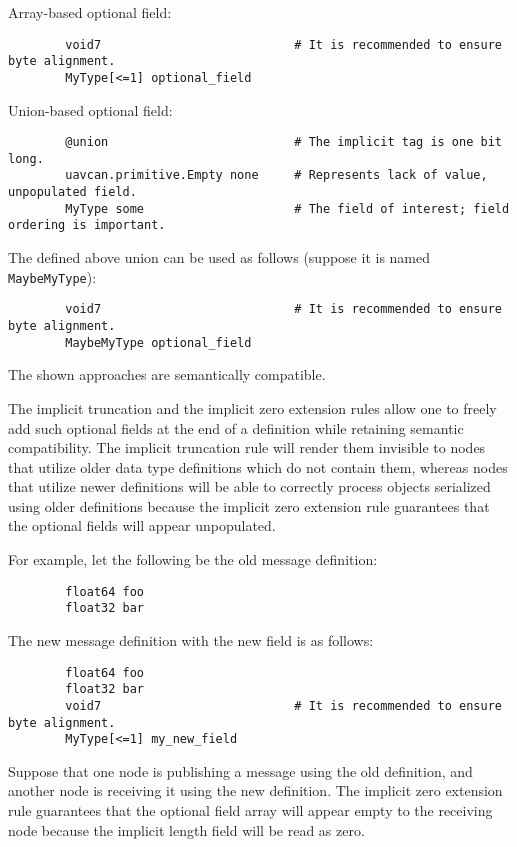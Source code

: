 \begin{remark}[breakable]
    Array-based optional field:

    \begin{verbatim}
        void7                           # It is recommended to ensure byte alignment.
        MyType[<=1] optional_field
    \end{verbatim}

    Union-based optional field:

    \begin{verbatim}
        @union                          # The implicit tag is one bit long.
        uavcan.primitive.Empty none     # Represents lack of value, unpopulated field.
        MyType some                     # The field of interest; field ordering is important.
    \end{verbatim}

    The defined above union can be used as follows (suppose it is named \verb|MaybeMyType|):

    \begin{verbatim}
        void7                           # It is recommended to ensure byte alignment.
        MaybeMyType optional_field
    \end{verbatim}

    The shown approaches are semantically compatible.
\end{remark}

\begin{remark}[breakable]
    The implicit truncation and the implicit zero extension rules allow one to freely add such optional fields
    at the end of a definition while retaining semantic compatibility.
    The implicit truncation rule will render them invisible to nodes that utilize older data type definitions
    which do not contain them, whereas nodes that utilize newer definitions will be able to correctly process
    objects serialized using older definitions because the implicit zero extension rule guarantees
    that the optional fields will appear unpopulated.

    For example, let the following be the old message definition:

    \begin{verbatim}
        float64 foo
        float32 bar
    \end{verbatim}

    The new message definition with the new field is as follows:

    \begin{verbatim}
        float64 foo
        float32 bar
        void7                           # It is recommended to ensure byte alignment.
        MyType[<=1] my_new_field
    \end{verbatim}

    Suppose that one node is publishing a message using the old definition,
    and another node is receiving it using the new definition.
    The implicit zero extension rule guarantees that the optional field array will
    appear empty to the receiving node because the implicit length field will be read as zero.
\end{remark}

